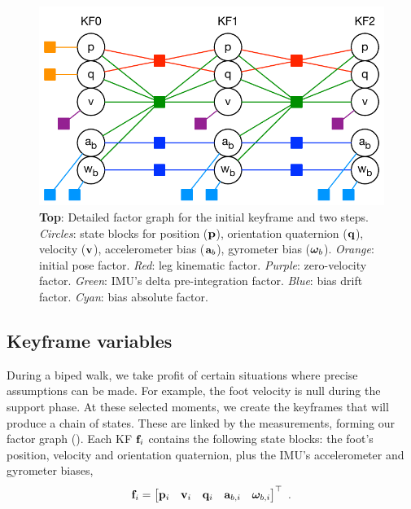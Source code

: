 \begin{figure}[tb]
\centering
\includegraphics[scale=0.65]{figures/graph_exploded}
\caption{
{\bf Top}: Detailed factor graph for the initial keyframe and two steps. 
\emph{Circles}: state blocks for position (${\bf p}$), orientation quaternion (${\bf q}$), velocity (${\bf v}$), accelerometer bias (${\bf a}_b$), gyrometer bias (${{\bm \omega}}_b$). 
\emph{Orange}: initial pose factor. 
\emph{Red}: leg kinematic factor. 
\emph{Purple}: zero-velocity factor. 
\emph{Green}: IMU's delta pre-integration factor. 
\emph{Blue}: bias drift factor. 
\emph{Cyan}: bias absolute factor. 
}
\label{fig:factor_graph}
\end{figure}




\subsection{Keyframe variables}

During a biped walk, we take profit of certain situations where precise assumptions can be made. For example, the  foot velocity is null during the support phase. At these selected moments, we create the keyframes that will produce a chain of states. These are linked by the measurements, forming our factor graph (). Each KF ${\bf f}_i$ contains the following state blocks: the foot's position, velocity and orientation quaternion, plus the IMU's accelerometer and gyrometer biases,
%
\begin{align}
{\bf f}_i = \begin{bmatrix}
{\bf p}_i & {\bf v}_i & {\bf q}_i & {\bf a}_{b,i} & {{\bm \omega}}_{b,i}
\end{bmatrix}^{\top}
~.
\end{align}
%


